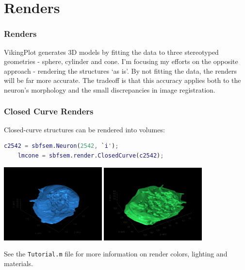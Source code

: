 \documentclass[11pt]{beamer}
\begin{document}
\section{Renders}
\begin{frame}
	\frametitle{Renders}
	VikingPlot generates 3D models by fitting the data to three stereotyped geometries - sphere, cylinder and cone. I'm focusing my efforts on the opposite approach - rendering the structures `as is'. By not fitting the data, the renders will be far more accurate. The tradeoff is that this accuracy applies both to the neuron's morphology and the small discrepancies in image registration.
\end{frame}
\begin{frame}[fragile]
	\frametitle{Closed Curve Renders}
	Closed-curve structures can be rendered into volumes:
	\begin{lstlisting}[language=matlab]
	c2542 = sbfsem.Neuron(2542, `i');
	lmcone = sbfsem.render.ClosedCurve(c2542);\end{lstlisting}
	\begin{center}
		\includegraphics[width=0.4\textwidth]{scone_render}
		\hskip5pt
		\includegraphics[width=0.4\textwidth]{lmcone_render}
	\end{center}
	See the \texttt{Tutorial.m} file for more information on render colors, lighting and materials.
\end{frame}
\end{document}
